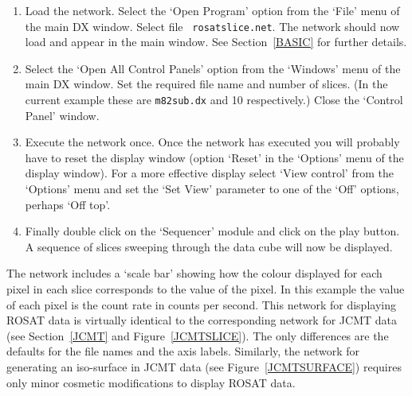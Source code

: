 \documentclass[twoside,11pt]{article}
\newcommand{\stardocinitials}  {SC}
\newcommand{\stardocnumber}    {2.3}
\newcommand{\stardocname}{\stardocinitials /\stardocnumber}
\begin{document}
\begin{enumerate}
\begin{figure}[htbp]
  \end{figure}

  \begin{enumerate}

    \item Load the network.  Select the `Open Program' option from the
     `File' menu of the main DX window.  Select file {\tt
     rosatslice.net}.  The network should now load and appear in the
     main window.  See Section~\ref{BASIC} for further details.

    \item Select the `Open All Control Panels' option from the `Windows'
     menu of the main DX window.  Set the required file name and
     number of slices.  (In the current example these are {\tt m82sub.dx}
     and 10 respectively.)  Close the `Control Panel' window.

    \item Execute the network once.  Once the network has executed you
     will probably have to reset the display window (option `Reset' in
     the `Options' menu of the display window).  For a more effective
     display select `View control' from the `Options' menu and set the
     `Set View' parameter to one of the `Off' options, perhaps `Off top'.

    \item Finally double click on the `Sequencer' module and click on
     the play button.  A sequence of slices sweeping through the data
     cube will now be displayed.

  \end{enumerate}

   The network includes a `scale bar' showing how the colour displayed
   for each pixel in each slice corresponds to the value of the pixel.
   In this example the value of each pixel is the count rate in counts
   per second.  This network for displaying ROSAT data is virtually
   identical to the corresponding network for JCMT data (see
   Section~\ref{JCMT} and Figure~\ref{JCMTSLICE}).  The only differences
   are the defaults for the file names and the axis labels.  Similarly,
   the network for generating an iso-surface in JCMT data (see
   Figure~\ref{JCMTSURFACE}) requires only minor cosmetic modifications
   to display ROSAT data.

\end{enumerate}


\cleardoublepage
\markboth{\stardocname}{\stardocname}
\end{document}
